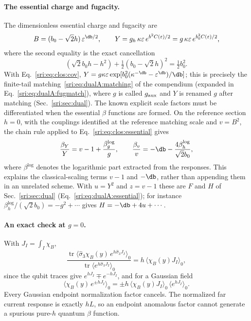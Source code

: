 \paragraph{The essential charge and fugacity.} The dimensionless essential charge and fugacity are
\begin{equation}
 B=(b_0-\sqrt2h)\,\varepsilon^{\db/2},\qquad
 Y=g_h\,\kappa\varepsilon\,e^{b^2C(\varepsilon)/2}=g\,\kappa\varepsilon\,e^{b_0^2C(\varepsilon)/2},
 \label{sri:eq:clos:essential}
\end{equation}
where the second equality is the exact cancellation
\begin{equation}
 (\sqrt2b_0h-h^2)+\tfrac12(b_0-\sqrt2h)^2=\tfrac12b_0^2 .
 \label{sri:eq:clos:wickcancel}
\end{equation}
With Eq.~\eqref{sri:eq:clos:cov}, $Y=g\kappa\varepsilon\exp[b_0^2(\kappa^{-\db}-\varepsilon^{\db})/\db]$; this is precisely
the finite-tail matching~\eqref{sri:eq:dualA:matching} of the compendium (expanded in Eq.~\eqref{sri:eq:dualA:fugmatch}), where $g$ is called $g_{\rm aux}$ and $Y$ is
renamed $g$ after matching (Sec.~\ref{sri:sec:dual}). The known explicit scale factors must be differentiated when the essential $\beta$ functions are
formed. On the reference section $h=0$, with the couplings identified at the reference matching scale and $v=B^2$,
the chain rule applied to Eq.~\eqref{sri:eq:clos:essential} gives
\begin{equation}
 \frac{\beta_Y}{Y}=v-1+\frac{\beta_g^{\log}}{g},\qquad
 \frac{\beta_v}{v}=-\db-\frac{4\beta_h^{\log}}{\sqrt2b_0},
 \label{sri:eq:clos:classical}
\end{equation}
where $\beta^{\log}$ denotes the logarithmic part extracted from the responses. This explains the classical-scaling terms
$v-1$ and $-\db$, rather than appending them in an unrelated scheme. With $u=Y^2$ and $z=v-1$ these are $F$ and $H$ of
Sec.~\ref{sri:sec:dual} (Eq.~\eqref{sri:eq:dualA:essential}); for instance $\beta_h^{\log}/(\sqrt2b_0)=-g^2+\cdots$ gives
$H=-\db+4u+\cdots$.

\paragraph{An exact check at \texorpdfstring{$g=0$}{g=0}.} With $J_I=\int_I\chi_B$,
\begin{equation}
 \frac{\operatorname{tr}\langle\hat\sigma_3\chi_B(y)\,e^{h\hat\sigma_3J_I}\rangle_0}
 {\operatorname{tr}\langle e^{h\hat\sigma_3J_I}\rangle_0}=h\,\langle\chi_B(y)J_I\rangle_0 ,
\end{equation}
since the qubit traces give $e^{hJ_I}\mp e^{-hJ_I}$, and for a Gaussian field
\begin{equation}
 \langle\chi_B(y)\,e^{\pm hJ_I}\rangle_0=\pm h\,\langle\chi_B(y)J_I\rangle_0\,\langle e^{hJ_I}\rangle_0 .
\end{equation}
Every Gaussian endpoint normalization factor cancels. The normalized far current response is exactly $hL$, so an
endpoint anomalous factor cannot generate a spurious pure-$h$ quantum $\beta$ function.

